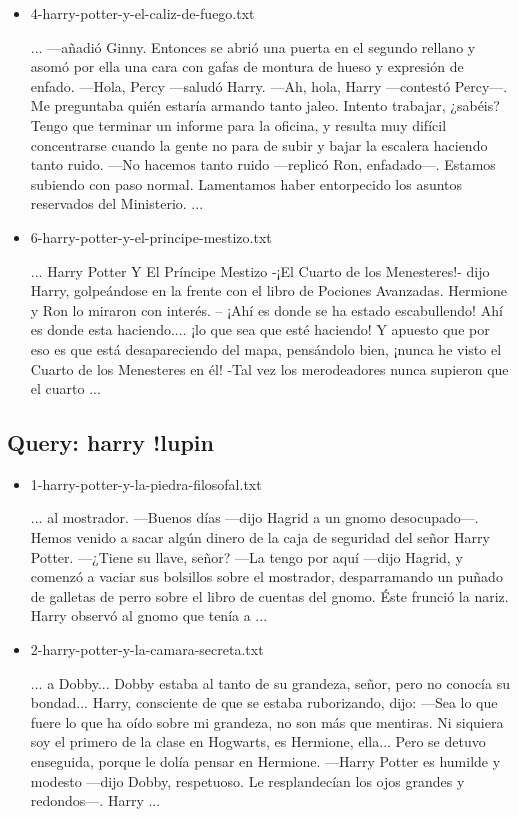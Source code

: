 \documentclass[a4paper,12pt,]{article}
\begin{document}
\begin{itemize}
    \item 4-harry-potter-y-el-caliz-de-fuego.txt
    
    ... —añadió Ginny. Entonces se abrió una puerta en el segundo rellano y asomó por ella una cara con gafas de 
    montura de hueso y expresión de enfado. —Hola, Percy —saludó Harry. —Ah, hola, Harry —contestó Percy—. Me 
    preguntaba quién estaría armando tanto jaleo. Intento trabajar, ¿sabéis? Tengo que terminar un informe para la 
    oficina, y resulta muy difícil concentrarse cuando la gente no para de subir y bajar la escalera haciendo tanto 
    ruido. —No hacemos tanto ruido —replicó Ron, enfadado—. Estamos subiendo con paso normal. Lamentamos haber 
    entorpecido los asuntos reservados del Ministerio. ...

    \item 6-harry-potter-y-el-principe-mestizo.txt
    
    ... Harry Potter Y El Príncipe Mestizo -¡El Cuarto de los Menesteres!- dijo Harry, golpeándose en la frente con 
    el libro de Pociones Avanzadas. Hermione y Ron lo miraron con interés. – ¡Ahí es donde se ha estado escabullendo! 
    Ahí es donde esta haciendo.... ¡lo que sea que esté haciendo! Y apuesto que por eso es que está desapareciendo 
    del mapa, pensándolo bien, ¡nunca he visto el Cuarto de los Menesteres en él! -Tal vez los merodeadores nunca 
    supieron que el cuarto ...
\end{itemize}

\subsection*{Query: harry !lupin}
\begin{itemize}
    \item 1-harry-potter-y-la-piedra-filosofal.txt
    
    ... al mostrador. —Buenos días —dijo Hagrid a un gnomo desocupado—. Hemos venido a sacar algún dinero de la 
    caja de seguridad del señor Harry Potter. —¿Tiene su llave, señor? —La tengo por aquí —dijo Hagrid, y comenzó 
    a vaciar sus bolsillos sobre el mostrador, desparramando un puñado de galletas de perro sobre el libro de 
    cuentas del gnomo. Éste frunció la nariz. Harry observó al gnomo que tenía a ...

    \item 2-harry-potter-y-la-camara-secreta.txt
    
    ... a Dobby... Dobby estaba al tanto de su grandeza, señor, pero no conocía su bondad... Harry, consciente de 
    que se estaba ruborizando, dijo: —Sea lo que fuere lo que ha oído sobre mi grandeza, no son más que mentiras. 
    Ni siquiera soy el primero de la clase en Hogwarts, es Hermione, ella... Pero se detuvo enseguida, porque le 
    dolía pensar en Hermione. —Harry Potter es humilde y modesto —dijo Dobby, respetuoso. Le resplandecían los ojos 
    grandes y redondos—. Harry ...
\end{itemize}
\end{document}
